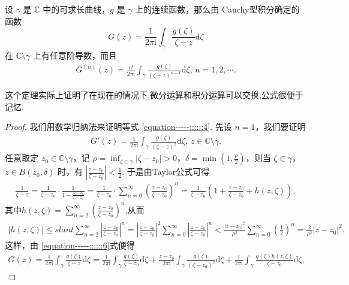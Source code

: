 \documentclass[../../main.tex]{subfiles}
\begin{document}
\begin{theorem}\label{theorem:定理3.4.2}
设 \( \gamma \) 是 \( \mathbb{C} \) 中的可求长曲线，\( g \) 是 \( \gamma \) 上的连续函数，那么由 Cauchy型积分确定的函数
\[
G(z) = \frac{1}{2\pi \mathrm{i}} \int_{\gamma} \frac{g(\zeta)}{\zeta - z} \mathrm{d}\zeta
\]
在 \( \mathbb{C} \setminus \gamma \) 上有任意阶导数，而且
\begin{align}
G^{(n)}(z) = \frac{n!}{2\pi \mathrm{i}} \int_{\gamma} \frac{g(\zeta)}{(\zeta - z)^{n + 1}} \mathrm{d}\zeta, \, n = 1, 2, \cdots. \label{equation-----::::::4}
\end{align}
\end{theorem}
\begin{note}
这个定理实际上证明了在现在的情况下,微分运算和积分运算可以交换,公式很便于记忆.
\end{note}
\begin{proof}
我们用数学归纳法来证明等式 \eqref{equation-----::::::4}. 先设 \( n = 1 \)，我们要证明
\begin{align}\label{equation-----::::::5}
G'(z) = \frac{1}{2\pi \mathrm{i}} \int_{\gamma} \frac{g(\zeta)}{(\zeta - z)^2} \mathrm{d}\zeta, \, z \in \mathbb{C} \setminus \gamma. 
\end{align}
任意取定 \( z_0 \in \mathbb{C} \setminus \gamma \)，记 \( \rho = \inf_{\zeta \in \gamma} |\zeta - z_0| > 0 \)，\( \delta = \min\left(1, \frac{\rho}{2}\right) \)，则当 \( \zeta \in \gamma \)，\( z \in B(z_0, \delta) \) 时，有 \( \left| \frac{z - z_0}{\zeta - z_0} \right| < \frac{1}{2} \). 于是由Taylor公式可得
\begin{align}\label{equation-----::::::6}
\frac{1}{\zeta -z}=\frac{1}{\zeta -z_0}\cdot \frac{1}{1-\frac{z-z_0}{\zeta -z_0}}=\frac{1}{\zeta -z_0}\cdot \sum_{n=0}^{\infty}{\left( \frac{z-z_0}{\zeta -z_0} \right) ^n}=\frac{1}{\zeta -z_0}\left( 1+\frac{z-z_0}{\zeta -z_0}+h(z,\zeta ) \right) ,
\end{align}
其中$h(z,\zeta)=\sum_{n=2}^{\infty}{\left( \frac{z-z_0}{\zeta -z_0} \right)^n}$,从而
\begin{align}\label{equation-----::::::7}
|h(z,\zeta )|\leqslant slant \sum_{n=2}^{\infty}{\left| \frac{z-z_0}{\zeta -z_0} \right|^n}=\left| \frac{z-z_0}{\zeta -z_0} \right|^2\sum_{n=0}^{\infty}{\left| \frac{z-z_0}{\zeta -z_0} \right|^n}<\frac{|z-z_0|^2}{\rho ^2}\sum_{n=0}^{\infty}{\left( \frac{1}{2} \right) ^n}=\frac{2}{\rho ^2}|z-z_0|^2.
\end{align}
这样，由 \eqref{equation-----::::::6}式便得
\begin{align*}
G(z) = \frac{1}{2\pi \mathrm{i}} \int_{\gamma} \frac{g(\zeta)}{\zeta - z} \mathrm{d}\zeta = \frac{1}{2\pi \mathrm{i}} \int_{\gamma} \frac{g(\zeta)}{\zeta - z_0} \mathrm{d}\zeta + \frac{z - z_0}{2\pi \mathrm{i}} \int_{\gamma} \frac{g(\zeta)}{(\zeta - z_0)^2} \mathrm{d}\zeta   + \frac{1}{2\pi \mathrm{i}} \int_{\gamma} \frac{g(\zeta)h(z, \zeta)}{\zeta - z_0} \mathrm{d}\zeta,

\end{align*}
\end{proof}
\end{document}
